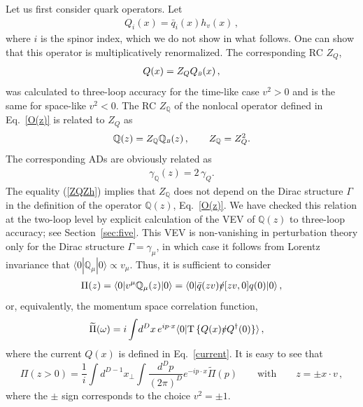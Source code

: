 \documentclass[12pt]{article}
\numberwithin{equation}{section}
\newcommand{\1}[1]{\mathbf{1}^{#1}}
\newcommand{\2}[1]{\mathbf{2}^{#1}}
\newcommand{\3}[1]{\mathbf{3}^{#1}}
\newcommand{\4}[1]{\mathbf{4}^{#1}}
\newcommand{\5}[1]{\mathbf{5}^{#1}}
\newcommand{\EQN}[1]{\hspace{3mm}\fbox{\fbox{$#1$}} \label{#1}}
\newcommand{\mlabel}[1]{ \text{\footnotesize \hspace{3mm}\fbox{\fbox{$#1$}} \label{#1}}}
\renewcommand{\EQN}[1]{\mlabel{#1}}
\renewcommand{\mlabel}[1]{\label{#1}}
\renewcommand{\EQN}[1]{\label{#1}}
\newcommand{\beq}{\begin{equation}}
\newcommand{\eeq}{\end{equation}}
\newcommand{\re}[1]{(\ref{#1})}
\newcommand{\ga}{\gamma}
\newcommand{\vv}{v^2}
\newcommand{\Q}{\mathbb{Q}}
\newcommand{\jj}{Q}
\begin{document}
Let us first consider quark operators.
Let 
\begin{align}
\mlabel{current}
  \jj_i(x) = \bar q_i(x) h_v(x)\,,
\end{align}
where $i$ is the spinor index, which we do not show in what follows.
One can show that this operator is multiplicatively renormalized. 
The corresponding RC $Z_{\jj}$,  
\begin{align}
    \jj(x) = Z_\jj \jj_{\sB}(x)\,, 
\mlabel{BfromR:ops}   
\end{align}
was calculated to three-loop accuracy for the time-like case $\vv >  0$ \cite{Chetyrkin:2003vi}
and is the same for space-like $\vv <  0$. 
The RC $Z_{\Q}$ of the nonlocal operator defined in Eq.~\eqref{O(z)} is related to $Z_{\jj}$
as~\cite{Ji:2017oey}
\begin{align}
 \Q(z) = Z_{\Q} \Q_{\sB}(z)\,, \qquad  Z_{\Q} = Z_{\jj}^2.
\EQN{ZQZh}
\end{align} 
The corresponding ADs are obviously related as
\begin{align}
 \ga_\Q(z) = 2\,\ga_Q.
\EQN{gaQgah}
\end{align}
 The  equality \re{ZQZh} implies that $Z_{\Q}$ does not depend on the Dirac structure
$\Gamma$ in the definition of the operator $\Q(z)$, Eq.~\eqref{O(z)}.  We have
checked this relation at the two-loop level by explicit calculation of the VEV of
$\Q(z)$ to three-loop accuracy; see Section~\ref{sec:five}.
This VEV is non-vanishing in perturbation theory only for 
the Dirac structure $\Gamma = \gamma_\mu$, in which case it follows from Lorentz invariance that 
$\langle 0|\Q_\mu|0\rangle \propto v_\mu$. Thus, it is sufficient to consider 
\begin{align}
  \Pi(z) =   \langle 0|v^\mu \Q_\mu(z) |0\rangle =  \langle 0| \bar q(zv)\slashed{v}[zv,0] q(0)|0\rangle\,,   
\mlabel{<O(z)>}
\end{align}  
or, equivalently, the momentum space correlation function,
\begin{align}
  \widetilde{\Pi}(\omega) & =  i\int\!d^D x \, e^{ip\cdot x} \langle 0| \text{T}\,\{\jj(x) \slashed{v} \jj^\dagger (0)\}  
\mlabel{Pi(omega)}\rangle\,,
\end{align}
where the current $\jj(x)$ is defined in Eq.~\eqref{current}.
It is easy to see that
\beq
\Pi(z > 0) =  \frac{1}{i} 
\int d^{D-1}x_{\perp}      
\int \frac{d^Dp}{(2\pi)^D}  e^{-ip\cdot x} \tilde{\Pi}(p)
 \qquad \text{with} \qquad  z= \pm x\cdot v\,,
\eeq
where the $\pm$ sign corresponds to the choice $\vv = \pm 1$.
\end{document}

